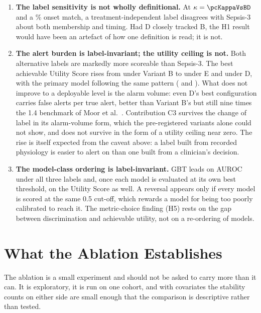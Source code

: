 \begin{enumerate}
    \item \textbf{The label sensitivity is not wholly definitional.} At
    $\kappa = \pcKappaVsBD$ and a \pcPctExactMatchD\% onset match, a
    treatment-independent label
    disagrees with Sepsis-3 about both membership and timing. Had D closely
    tracked B, the H1 result would have been an artefact of how one definition
    is read; it is not.

    \item \textbf{The alert burden is label-invariant; the utility ceiling is
    not.} Both alternative labels are markedly more scoreable than Sepsis-3.
    The best achievable Utility Score rises from \pcUtilityMaxGbtB{} under
    Variant B to \pcUtilityMaxGbtE{} under E and \pcUtilityMaxGbtD{} under D,
    with the primary model following the same pattern
    (\pcUtilityMaxPrimaryE{} and \pcUtilityMaxPrimaryD). What does not improve
    to a deployable level is the alarm volume: even D's best configuration
    carries \pcUtilityOptBurdenGbtD{} false alerts per true alert, better than
    Variant B's \pcUtilityOptBurdenGbtB{} but still nine times the 1.4
    benchmark of Moor et al.\ \cite{moor2023review}. Contribution C3 survives
    the change of label in its alarm-volume form, which the pre-registered
    variants alone could not show, and does not survive in the form of a
    utility ceiling near zero. The rise is itself expected from the caveat
    above: a label built from recorded physiology is easier to alert on than
    one built from a clinician's decision.

    \item \textbf{The model-class ordering is label-invariant.} GBT leads on
    AUROC under all three labels and, once each model is evaluated at its own
    best threshold, on the Utility Score as well. A reversal appears only if
    every model is scored at the same 0.5 cut-off, which rewards a model for
    being too poorly calibrated to reach it. The
    metric-choice finding (H5) rests on the gap between discrimination and
    achievable utility, not on a re-ordering of models.
\end{enumerate}


\section{What the Ablation Establishes}
\label{sec:ablation_establishes}

The ablation is a small experiment and should not be asked to carry more than
it can. It is exploratory, it is run on one cohort, and with \pcHTwoNTerms{}
covariates the stability counts on either side are small enough that the
comparison is descriptive rather than tested.

